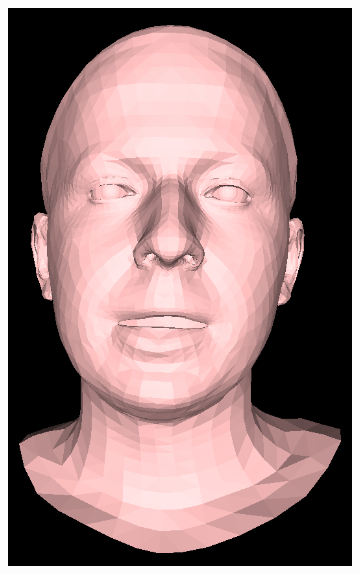 \begin{figure}[h]
\begin{subfigure}[b]{0.19\textwidth}
        \includegraphics[width=\textwidth]{figures/voca_exp/vocaset_exp3.png}
    \end{subfigure}
    \begin{subfigure}[b]{0.19\textwidth}

\end{subfigure}
\end{figure}
